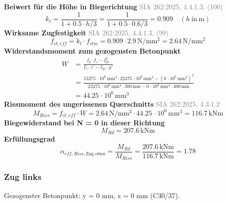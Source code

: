 \documentclass[11pt,a4paper]{article}
\newcommand{\normref}[1]{{\small\textcolor{gray}{#1}}}
\begin{document}
\noindent\textbf{Beiwert für die Höhe in Biegerichtung} \hfill \normref{SIA 262:2025, 4.4.1.3, (100)}
\begin{equation*}
k_t = \frac{1}{1 + 0.5 \cdot h/3} = \frac{1}{1 + 0.5 \cdot 0.6/3} = 0.909 \quad \left(h\ \text{in}\ \mathrm{m}\right)
\end{equation*}
\noindent\textbf{Wirksame Zugfestigkeit} \hfill \normref{SIA 262:2025, 4.4.1.3, (99)}
\begin{equation*}
f_{ct,eff} = k_t \cdot f_{ctm} = 0.909 \cdot 2.9\,\mathrm{N}/\mathrm{mm}^{2} = 2.64\,\mathrm{N}/\mathrm{mm}^{2}
\end{equation*}
\noindent\textbf{Widerstandsmoment zum gezogensten Betonpunkt}
\begin{equation*}
\begin{aligned}
  W &= \frac{I_y \cdot I_z - I_{yz}^{2}}{I_z \cdot z' - I_{yz} \cdot y'} \\
  &= \frac{13275\,\cdot 10^{6}\,\mathrm{mm}^{4} \cdot 22475\,\cdot 10^{6}\,\mathrm{mm}^{4} - \left(0\,\cdot 10^{6}\,\mathrm{mm}^{4}\right)^{2}}{22475\,\cdot 10^{6}\,\mathrm{mm}^{4} \cdot 300\,\mathrm{mm} - 0\,\cdot 10^{6}\,\mathrm{mm}^{4} \cdot 400\,\mathrm{mm}} \\
  &= 44.25\,\cdot 10^{6}\,\mathrm{mm}^{3}
\end{aligned}
\end{equation*}
\noindent\textbf{Rissmoment des ungerissenen Querschnitts} \hfill \normref{SIA 262:2025, 4.3.1.2}
\begin{equation*}
M_{Riss} = f_{ct,eff} \cdot W = 2.64\,\mathrm{N}/\mathrm{mm}^{2} \cdot 44.25\,\cdot 10^{6}\,\mathrm{mm}^{3} = 116.7\,\mathrm{kNm}
\end{equation*}
\noindent\textbf{Biegewiderstand bei N = 0 in dieser Richtung}
\begin{equation*}
M_{Rd} = 207.6\,\mathrm{kNm}
\end{equation*}
\noindent\textbf{Erfüllungsgrad}
\begin{equation*}
\alpha_{eff,Riss,\text{Zug oben}} = \frac{M_{Rd}}{M_{Riss}} = \frac{207.6\,\mathrm{kNm}}{116.7\,\mathrm{kNm}} = 1.78
\end{equation*}
\subsubsection{Zug links}
Gezogenster Betonpunkt: y = 0 mm, z = 0 mm (C30/37).
\end{document}
